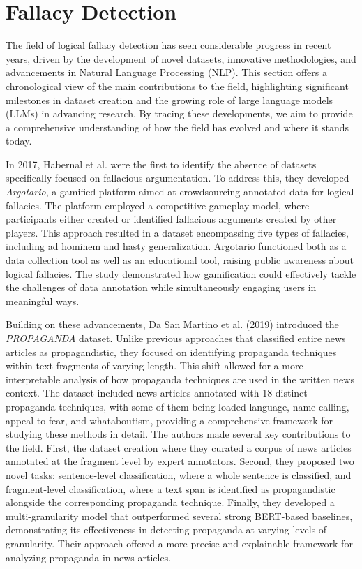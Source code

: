 \section{Fallacy Detection}

The field of logical fallacy detection has seen considerable progress in recent years, driven by the development of novel datasets, innovative methodologies, and advancements in Natural Language Processing (NLP). This section offers a chronological view of the main contributions to the field, highlighting significant milestones in dataset creation and the growing role of large language models (LLMs) in advancing research. By tracing these developments, we aim to provide a comprehensive understanding of how the field has evolved and where it stands today.
\par
In 2017, Habernal et al. \cite{habernalArgotarioComputationalArgumentation2017} were the first to identify the absence of datasets specifically focused on fallacious argumentation. To address this, they developed \textit{Argotario}, a gamified platform aimed at crowdsourcing annotated data for logical fallacies. The platform employed a competitive gameplay model, where participants either created or identified fallacious arguments created by other players. This approach resulted in a dataset encompassing five types of fallacies, including ad hominem and hasty generalization. Argotario functioned both as a data collection tool as well as an educational tool, raising public awareness about logical fallacies. The study demonstrated how gamification could effectively tackle the challenges of data annotation while simultaneously engaging users in meaningful ways.
\par


Building on these advancements, Da San Martino et al. (2019) \cite{dasanmartinoFineGrainedAnalysisPropaganda2019} introduced the \textit{PROPAGANDA} dataset. Unlike previous approaches that classified entire news articles as propagandistic, they focused on identifying propaganda techniques within text fragments of varying length. This shift allowed for a more interpretable analysis of how propaganda techniques are used in the written news context. The dataset included news articles annotated with 18 distinct propaganda techniques, with some of them being loaded language, name-calling, appeal to fear, and whataboutism, providing a comprehensive framework for studying these methods in detail.
The authors made several key contributions to the field. First, the dataset creation where they curated a corpus of news articles annotated at the fragment level by expert annotators. Second, they proposed two novel tasks: sentence-level classification, where a whole sentence is classified, and fragment-level classification, where a text span is identified as propagandistic alongside the corresponding propaganda technique. Finally, they developed a multi-granularity model that outperformed several strong BERT-based \cite{kenton2019bert} baselines, demonstrating its effectiveness in detecting propaganda at varying levels of granularity.
Their approach offered a more precise and explainable framework for analyzing propaganda in news articles.
\par

